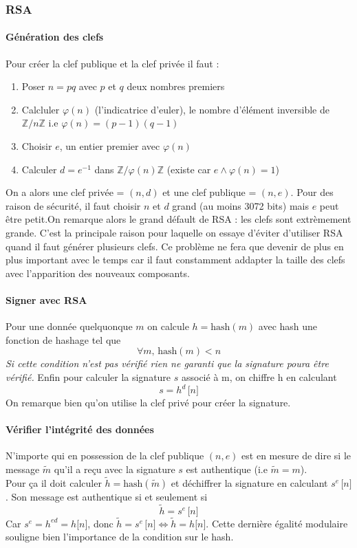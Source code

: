 \documentclass[a4paper, 12pt]{article}
\begin{document}
\subsubsection{RSA}
\paragraph{Génération des clefs}
\noindent Pour créer la clef publique et la clef privée il faut :
\begin{enumerate}
	\item Poser $n = pq$ avec $p$ et $q$ deux nombres premiers
	\item Calcluler $\varphi(n)$ (l'indicatrice d'euler), le nombre d'élément inversible de $\mathbb{Z}/n\mathbb{Z}$ i.e $\varphi\left( n\right) = (p-1)(q-1)$
	\item Choisir $e$, un entier premier avec $\varphi(n)$
	\item Calculer $d = e^{-1}$ dans $\mathbb{Z}/\varphi(n)\mathbb{Z}$ (existe car $e \wedge \varphi(n) = 1$) 
\end{enumerate}
On a alors une clef privée = $(n, d)$ et une clef publique = $(n,e)$. Pour des raison de sécurité, il faut choisir $n$ et $d$ grand (au moins 3072 bits) mais $e$ peut être petit.On remarque alors le grand défault de RSA :  les clefs sont extrèmement grande. C'est la principale raison pour laquelle on essaye d'éviter d'utiliser RSA quand il faut générer plusieurs clefs. Ce problème ne fera que devenir de plus en plus important avec le temps car il faut constamment addapter la taille des clefs avec l'apparition des nouveaux composants.

\paragraph{Signer avec RSA}
Pour une donnée quelquonque $m$ on calcule $h = \text{hash}(m)$ avec hash une fonction de hashage tel que 
$$
\forall m, \, \text{hash}(m) < n
$$ 
\emph{Si cette condition n'est pas vérifié rien ne garanti que la signature poura être vérifié.}
Enfin pour calculer la signature $s$ associé à m, on chiffre h en calculant 
$$
s = h^d \, \lbrack n \rbrack
$$
On remarque bien qu'on utilise la clef privé pour créer la signature.

\paragraph{Vérifier l'intégrité des données}
N'importe qui en possession de la clef publique $(n, e)$ est en mesure de dire si le message $\tilde{m}$ qu'il a reçu avec la signature $s$ est authentique (i.e $\tilde{m} = m$). \\
Pour ça il doit calculer $\tilde{h} = \text{hash}(\tilde{m})$ et déchiffrer la signature en calculant $s^e \, \lbrack n \rbrack$. Son message est authentique si et seulement si 
$$
\tilde{h} = s^e \, \lbrack n \rbrack
$$
Car $s^e = h^{ed} = h \lbrack n \rbrack$, donc $\tilde{h} = s^e \, \lbrack n \rbrack \Leftrightarrow \tilde{h} = h \lbrack n \rbrack$. Cette dernière égalité modulaire souligne bien l'importance de la condition sur le hash.
\end{document}

